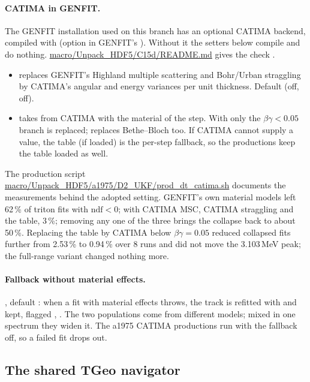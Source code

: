 \paragraph{CATIMA in GENFIT.} The GENFIT installation used on this branch has an optional CATIMA backend, compiled
with  (option in GENFIT's ). Without it the setters below compile
and do nothing. \url{macro/Unpack_HDF5/C15d/README.md} gives the check
.
\begin{itemize}
\item {} replaces GENFIT's Highland multiple scattering and Bohr/Urban
  straggling by CATIMA's angular and energy variances per unit thickness. Default (off, off).
\item {} takes \dedx{} from CATIMA with the material of the step. With
   only the $\beta\gamma<0.05$ branch is replaced;  replaces Bethe--Bloch too.
  If CATIMA cannot supply a value, the table (if loaded) is the per-step fallback, so the productions keep the table
  loaded as well.
\end{itemize}
The production script \url{macro/Unpack_HDF5/a1975/D2_UKF/prod_dt_catima.sh} documents the measurements behind the
adopted setting. GENFIT's own material models left 62\,\% of triton fits with $\mathrm{ndf}<0$; with CATIMA MSC,
CATIMA straggling and the table, 3\,\%; removing any one of the three brings the collapse back to about 50\,\%.
Replacing the table by CATIMA \dedx{} below $\beta\gamma=0.05$ reduced collapsed fits further from 2.53\,\% to
0.94\,\% over 8 runs and did not move the 3.103\,MeV peak; the full-range variant changed nothing more.

\paragraph{Fallback without material effects.} , default : when a fit with
material effects throws, the track is refitted with  and kept, flagged
, . The two populations come from different models;
mixed in one spectrum they widen it. The a1975 CATIMA productions run with the fallback off, so a failed fit drops out.

\subsection{The shared TGeo navigator}
\label{sec:gf-navigator}

